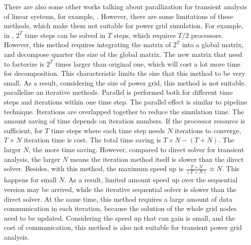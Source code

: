 \documentclass[conference]{IEEEtran}
\begin{document}
There are also some other works talking about parallization for transient analysis of linear systems, for example, \cite{Alvarado, Scala, 
Chai}. However, there are some limitations of these methods, which make them not suitable for power grid simulation. For example, in 
\cite{Alvarado}, $2^T$ time steps can be solved in $T$ steps, which requires $T/2$ processors. However, this method requires integrating 
the matrix of $2^T$ into a global matrix, and decompose quarter the size of the global matrix. The new matrix that need to factorize is
$2^T$ times larger than original one, which will cost a lot more time for decomposition. This characteristic limits the size that this
method to be very small. As a result, considering the size of power grid, this method is not suitable. \cite{Chai} parallelize an 
iterative methods. Parallel is performed both for different time steps and iterations within one time step. The parallel effect is similar
to pipeline technique. Iterations are overlapped together to reduce the simulation time. The amount saving of time depends on iteration 
numbers. If the processor resource is sufficient, for $T$ time steps where each time step needs $N$ iterations to converge, $T+N$ iteration
time is cost. The total time saving is $T\times N - (T+N)$. The larger $N$, the more time saving. However, compared to direct
solver for transient analysis, the larger $N$ means the iteration method itself is slower than the direct solver. Besides, with this method, the maximum speed up is $\frac{T\times N}{(T+N)} \approx N$. This happens for small $N$. As a result, limited amount speed up over the sequential version may be arrived, while the iterative sequential solver is slower than the direct solver. 
At the same time, this method requires a large amount of data communication in each iteration, because the solution of the whole grid 
nodes need to be updated. Considering the speed up that can gain is small, and the cost of communication, this method is also not suitable
for transient power grid analysis. 
\end{document}
